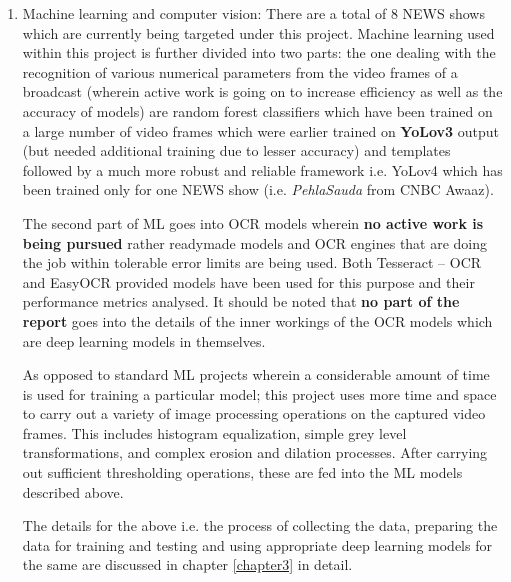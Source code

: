 \begin{enumerate}
  \item Machine learning and computer vision: There are a total of 8 NEWS shows which are currently being targeted under this project. Machine learning used within this project is further divided into two parts: the one dealing with the recognition of various numerical parameters from the video frames of a broadcast (wherein active work is going on to increase efficiency as well as the accuracy of models) are random forest classifiers which have been trained on a large number of video frames which were earlier trained on \textbf{YoLov3} output (but needed additional training due to lesser accuracy) and templates followed by a much more robust and reliable framework i.e. YoLov4 which has been trained only for one NEWS show (i.e. \textit{PehlaSauda} from CNBC Awaaz). \par

        The second part of ML goes into OCR models wherein \textbf{no active work is being pursued} rather readymade models and OCR engines that are doing the job within tolerable error limits are being used. Both Tesseract – OCR and EasyOCR provided models have been used for this purpose and their performance metrics analysed. It should be noted that \textbf{no part of the report} goes into the details of the inner workings of the OCR models which are deep learning models in themselves. \par

        As opposed to standard ML projects wherein a considerable amount of time is used for training a particular model; this project uses more time and space to carry out a variety of image processing operations on the captured video frames. This includes histogram equalization, simple grey level transformations, and complex erosion and dilation processes. After carrying out sufficient thresholding operations, these are fed into the ML models described above. \par

        The details for the above i.e. the process of collecting the data, preparing the data for training and testing and using appropriate deep learning models for the same are discussed in chapter \ref{chapter3} in detail.


\end{enumerate}
